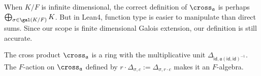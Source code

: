 \begin{remark}
  When $K/F$ is infinite dimensional, the correct definition of $\cross_{\mathfrak{a}}$ is perhaps $\bigoplus_{\sigma\in\gal(K/F)}K$. But in Lean4, function type is easier to manipulate than direct sums. Since our scope is finite dimensional Galois extension, our definition is still accurate.
\end{remark}

\begin{lemma}
  The cross product $\cross_{\mathfrak{a}}$ is a ring with the multiplicative unit $\Delta_{\mathsf{id}, \mathfrak{a}(\mathsf{id}, \mathsf{id})^{-1}}$. The $F$-action on $\cross_{\mathfrak{a}}$ defined by $r \cdot \Delta_{\sigma, c} := \Delta_{\sigma, r\cdot c}$ makes it an $F$-algebra.
  \leanok
\end{lemma}
